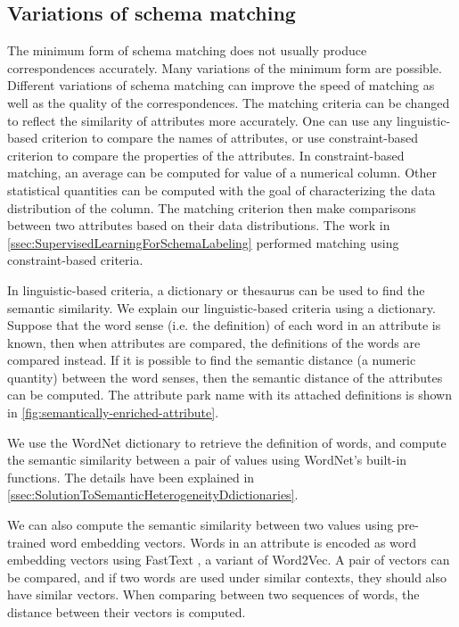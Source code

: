 \subsection{Variations of schema matching}
\label{ssec:VariationsOfSchemaMatching}

The minimum form of schema matching does not usually produce correspondences accurately. Many variations of the minimum form are possible. Different variations of schema matching can improve the speed of matching as well as the quality of the correspondences. The matching criteria can be changed to reflect the similarity of attributes more accurately. One can use any linguistic-based criterion to compare the names of attributes, or use constraint-based criterion to compare the properties of the attributes. In constraint-based matching, an average can be computed for value of a numerical column. Other statistical quantities can be computed with the goal of characterizing the data distribution of the column. The matching criterion then make comparisons between two attributes based on their data distributions. The work in \autoref{ssec:SupervisedLearningForSchemaLabeling} performed matching using constraint-based criteria.

In linguistic-based criteria, a dictionary or thesaurus can be used to find the semantic similarity. We explain our linguistic-based criteria using a dictionary. Suppose that the word sense (i.e. the definition) of each word in an attribute is known, then when attributes are compared, the definitions of the words are compared instead. If it is possible to find the semantic distance (a numeric quantity) between the word senses, then the semantic distance of the attributes can be computed. The attribute park name with its attached definitions is shown in \autoref{fig:semantically-enriched-attribute}.

We use the WordNet dictionary to retrieve the definition of words, and compute the semantic similarity between a pair of values using WordNet's built-in functions. The details have been explained in \autoref{ssec:SolutionToSemanticHeterogeneityDdictionaries}.

We can also compute the semantic similarity between two values using pre-trained word embedding vectors. Words in an attribute is encoded as word embedding vectors using FastText \cite{Mudgal2018Deep,Nargesian2018Table}, a variant of Word2Vec. A pair of vectors can be compared, and if two words are used under similar contexts, they should also have similar vectors. When comparing between two sequences of words, the distance between their vectors is computed.

